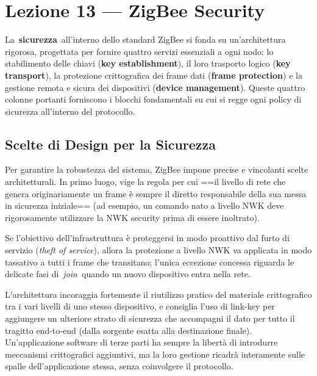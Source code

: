 \documentclass[
  italian,
  openany]{book}
\begin{document}
\newpage

\chapter{Lezione 13 --- ZigBee
Security}\label{lezione-13-zigbee-security}

La~\textbf{sicurezza}~all'interno dello standard ZigBee si fonda su
un'architettura rigorosa, progettata per fornire quattro servizi
essenziali a ogni nodo: lo stabilimento delle chiavi (\textbf{key
establishment}), il loro trasporto logico (\textbf{key transport}), la
protezione crittografica dei frame dati (\textbf{frame protection}) e la
gestione remota e sicura dei dispositivi (\textbf{device management}).
Queste quattro colonne portanti forniscono i blocchi fondamentali su cui
si regge ogni policy di sicurezza all'interno del protocollo.

\section{Scelte di Design per la
Sicurezza}\label{scelte-di-design-per-la-sicurezza}

Per garantire la robustezza del sistema, ZigBee impone precise e
vincolanti scelte architetturali. In primo luogo, vige la regola per cui
==il livello di rete che genera originariamente un frame è sempre il
diretto responsabile della sua messa in sicurezza iniziale== (ad
esempio, un comando nato a livello NWK deve rigorosamente utilizzare la
NWK security prima di essere inoltrato).

Se l'obiettivo dell'infrastruttura è proteggersi in modo proattivo dal
furto di servizio (\emph{theft of service}), allora la protezione a
livello NWK va applicata in modo tassativo a tutti i frame che
transitano; l'unica eccezione concessa riguarda le delicate fasi
di~\emph{join}~quando un nuovo dispositivo entra nella rete.

L'architettura incoraggia fortemente il riutilizzo pratico del materiale
crittografico tra i vari livelli di uno stesso dispositivo, e consiglia
l'uso di link-key per aggiungere un ulteriore strato di sicurezza che
accompagni il dato per tutto il tragitto end-to-end (dalla sorgente
esatta alla destinazione finale). Un'applicazione software di terze
parti ha sempre la libertà di introdurre meccanismi crittografici
aggiuntivi, ma la loro gestione ricadrà interamente sulle spalle
dell'applicazione stessa, senza coinvolgere il protocollo.
\end{document}
